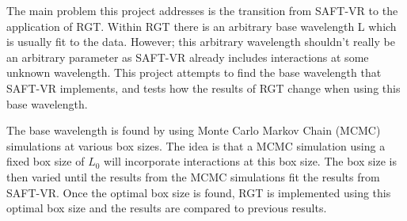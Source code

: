 The main problem this project addresses is the transition from SAFT-VR to the application of RGT. Within RGT there is an arbitrary base wavelength L which is usually fit to the data. However; this arbitrary wavelength shouldn't really be an arbitrary parameter as SAFT-VR already includes interactions at some unknown wavelength. This project attempts to find the base wavelength that SAFT-VR implements, and tests how the results of RGT change when using this base wavelength.

The base wavelength is found by using Monte Carlo Markov Chain (MCMC) simulations at various box sizes. The idea is that a MCMC simulation using a fixed box size of $L_0$ will incorporate interactions at this box size. The box size is then varied until the results from the MCMC simulations fit the results from SAFT-VR. Once the optimal box size is found, RGT is implemented using this optimal box size and the results are compared to previous results.

